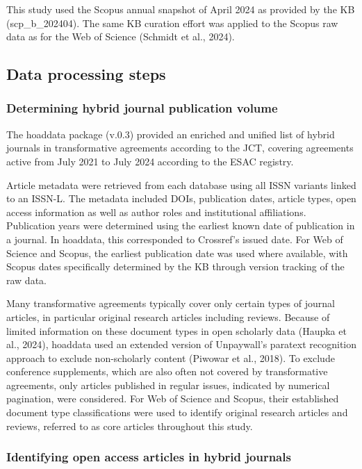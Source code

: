 \documentclass[a4paper,man,floatsintext,longtable,noextraspace,10pt]{apa6}
\begin{document}
This study used the Scopus annual snapshot of April 2024 as provided by
the KB (scp\_b\_202404). The same KB curation effort was applied to the
Scopus raw data as for the Web of Science (Schmidt et al., 2024).

\subsection{Data processing steps}\label{data-processing-steps}

\subsubsection{Determining hybrid journal publication
volume}\label{determining-hybrid-journal-publication-volume}

The hoaddata package (v.0.3) provided an enriched and unified list of
hybrid journals in transformative agreements according to the JCT,
covering agreements active from July 2021 to July 2024 according to the
ESAC registry.

Article metadata were retrieved from each database using all ISSN
variants linked to an ISSN-L. The metadata included DOIs, publication
dates, article types, open access information as well as author roles
and institutional affiliations. Publication years were determined using
the earliest known date of publication in a journal. In hoaddata, this
corresponded to Crossref's issued date. For Web of Science and Scopus,
the earliest publication date was used where available, with Scopus
dates specifically determined by the KB through version tracking of the
raw data.

Many transformative agreements typically cover only certain types of
journal articles, in particular original research articles including
reviews. Because of limited information on these document types in open
scholarly data (Haupka et al., 2024), hoaddata used an extended version
of Unpaywall's paratext recognition approach to exclude non-scholarly
content (Piwowar et al., 2018). To exclude conference supplements, which
are also often not covered by transformative agreements, only articles
published in regular issues, indicated by numerical pagination, were
considered. For Web of Science and Scopus, their established document
type classifications were used to identify original research articles
and reviews, referred to as core articles throughout this study.

\subsubsection{Identifying open access articles in hybrid
journals}\label{identifying-open-access-articles-in-hybrid-journals}
\end{document}
